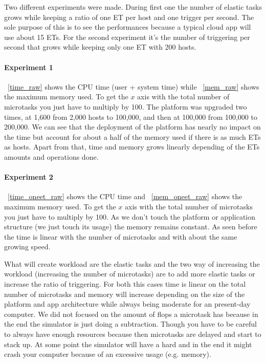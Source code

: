 \documentclass[a4paper, onecolumn]{article}
\begin{document}
	Two different experiments were made. During first one the number of elastic 
	tasks grows while keeping a ratio of one ET per host and one trigger per 
	second. The sole purpose of this is to see the performances because a 
	typical cloud app will use about 15 ETs. For the second experiment it's the 
	number of triggering per second that grows while keeping only one ET with 
	200 hosts.
    
    \paragraph{Experiment 1}
    \figurename~\ref{time_raw} shows the CPU time (user + system time) while
    \figurename~\ref{mem_raw} shows the maximum memory used. To get the $x$ axis
    with the total number of microtasks you just have to multiply by 100. The
    platform was upgraded two times, at 1,600 from 2,000 hosts to 100,000, and
    then at 100,000 from 100,000 to 200,000. We can see that the deployment of
    the platform has nearly no impact on the time but account for about a half
    of the memory used if there is as much ETs as hosts. Apart from that, time
    and memory grows linearly depending of the ETs amounts and operations done.
    
    \paragraph{Experiment 2}
    \figurename~\ref{time_oneet_raw} shows the CPU time and
    \figurename~\ref{mem_oneet_raw} shows the maximum memory used. To get the
    $x$ axis with the total number of microtasks you just have to multiply by
    100. As we don't touch the platform or application structure (we just touch
    its usage) the memory remains constant. As seen before the time is linear 
    with the number of microtasks and with about the same growing speed.
    
    What will create workload are the elastic tasks and the two way of 
    increasing the workload (increasing the number of microtasks) are to add 
    more elastic tasks or increase the ratio of triggering. For both this cases 
    time is linear on the total number of microtasks and memory will increase 
    depending on the size of the platform and app architecture while always 
    being moderate for an present-day computer. We did not focused on the 
    amount of flops a microtask has because in the end the simulator is just 
    doing a subtraction. Though you have to be careful to always have enough 
    resources because then microtasks are delayed and start to stack up. At 
    some point the simulator will have a hard and in the end it might crash 
    your computer because of an excessive usage (e.g. memory).
    
\end{document}
